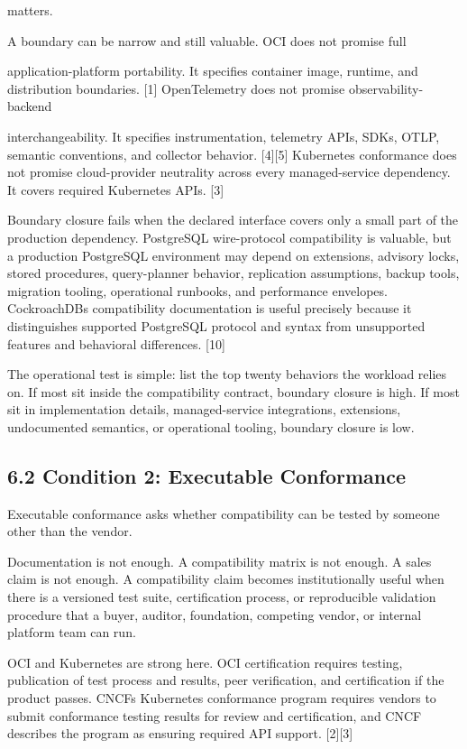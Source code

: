 \documentclass[11pt]{article}
\begin{document}
matters.

A boundary can be narrow and still valuable. OCI does not promise full

application-platform portability. It specifies container image, runtime, and distribution boundaries. {[}1{]} OpenTelemetry does not promise observability-backend

interchangeability. It specifies instrumentation, telemetry APIs, SDKs, OTLP, semantic conventions, and collector behavior. {[}4{]}{[}5{]} Kubernetes conformance does not promise cloud-provider neutrality across every managed-service dependency. It covers required Kubernetes APIs. {[}3{]}

Boundary closure fails when the declared interface covers only a small part of the production dependency. PostgreSQL wire-protocol compatibility is valuable, but a production PostgreSQL environment may depend on extensions, advisory locks, stored procedures, query-planner behavior, replication assumptions, backup tools, migration tooling, operational runbooks, and performance envelopes. CockroachDB\textquotesingle s compatibility documentation is useful precisely because it distinguishes supported PostgreSQL protocol and syntax from unsupported features and behavioral differences. {[}10{]}

The operational test is simple: list the top twenty behaviors the workload relies on. If most sit inside the compatibility contract, boundary closure is high. If most sit in implementation details, managed-service integrations, extensions, undocumented semantics, or operational tooling, boundary closure is low.

\subsection{6.2 Condition 2: Executable Conformance}\label{condition-2-executable-conformance}

Executable conformance asks whether compatibility can be tested by someone other than the vendor.

Documentation is not enough. A compatibility matrix is not enough. A sales claim is not enough. A compatibility claim becomes institutionally useful when there is a versioned test suite, certification process, or reproducible validation procedure that a buyer, auditor, foundation, competing vendor, or internal platform team can run.

OCI and Kubernetes are strong here. OCI certification requires testing, publication of test process and results, peer verification, and certification if the product passes. CNCF\textquotesingle s Kubernetes conformance program requires vendors to submit conformance testing results for review and certification, and CNCF describes the program as ensuring required API support. {[}2{]}{[}3{]}
\end{document}
